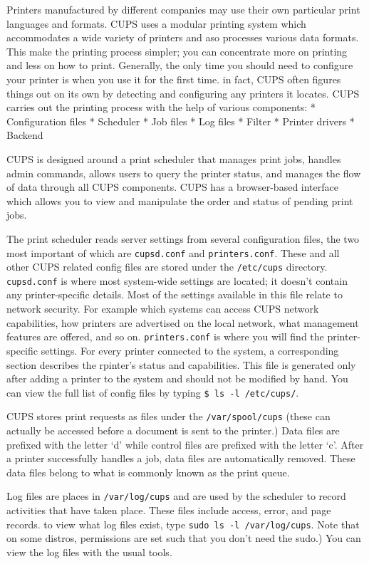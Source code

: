 Printers manufactured by different companies may use their own
particular print languages and formats. CUPS uses a modular printing
system which accommodates a wide variety of printers and aso processes
various data formats. This make the printing process simpler; you can
concentrate more on printing and less on how to print. Generally, the
only time you should need to configure your printer is when you use it
for the first time. in fact, CUPS often figures things out on its own by
detecting and configuring any printers it locates. CUPS carries out the
printing process with the help of various components: * Configuration
files * Scheduler * Job files * Log files * Filter * Printer drivers *
Backend

CUPS is designed around a print scheduler that manages print jobs,
handles admin commands, allows users to query the printer status, and
manages the flow of data through all CUPS components. CUPS has a
browser-based interface which allows you to view and manipulate the
order and status of pending print jobs.

The print scheduler reads server settings from several configuration
files, the two most important of which are \texttt{cupsd.conf} and
\texttt{printers.conf}. These and all other CUPS related config files
are stored under the \texttt{/etc/cups} directory. \texttt{cupsd.conf}
is where most system-wide settings are located; it doesn't contain any
printer-specific details. Most of the settings available in this file
relate to network security. For example which systems can access CUPS
network capabilities, how printers are advertised on the local network,
what management features are offered, and so on. \texttt{printers.conf}
is where you will find the printer-specific settings. For every printer
connected to the system, a corresponding section describes the rpinter's
status and capabilities. This file is generated only after adding a
printer to the system and should not be modified by hand. You can view
the full list of config files by typing \texttt{\$ ls -l /etc/cups/}.

CUPS stores print requests as files under the \texttt{/var/spool/cups}
(these can actually be accessed before a document is sent to the
printer.) Data files are prefixed with the letter `d' while control
files are prefixed with the letter `c'. After a printer successfully
handles a job, data files are automatically removed. These data files
belong to what is commonly known as the print queue.

Log files are places in \texttt{/var/log/cups} and are used by the
scheduler to record activities that have taken place. These files
include access, error, and page records. to view what log files exist,
type \texttt{sudo ls -l /var/log/cups}. Note that on some distros,
permissions are set such that you don't need the sudo.) You can view the
log files with the usual tools.

